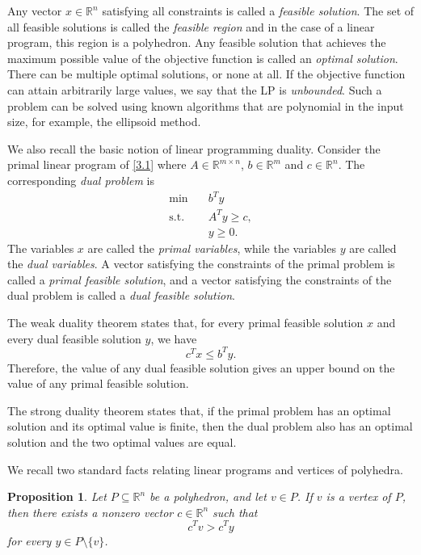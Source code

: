 \documentclass[12pt]{report}
\newtheorem{pprop}[base]{Proposition}
\numberwithin{algorithm}{chapter}
\begin{document}
	Any vector $x \in \mathbb{R}^n$ satisfying all constraints is called a \emph{feasible solution}. The set of all feasible solutions is called the \emph{feasible region} and in the case of a linear program, this region is a polyhedron. Any feasible solution that achieves the maximum possible value of the objective function is called an \emph{optimal solution}. There can be multiple optimal solutions, or none at all. If the objective function can attain arbitrarily large values, we say that the LP is \emph{unbounded}. Such a problem can be solved using known algorithms that are polynomial in the input size, for example, the ellipsoid method.
	
	We also recall the basic notion of linear programming duality. Consider the primal linear program of \eqref{3.1}
	where $A \in \mathbb{R}^{m \times n}$, $b \in \mathbb{R}^{m}$ and $c \in \mathbb{R}^{n}$. The corresponding \emph{dual problem} is
	\[
	\begin{aligned}
		\min \quad & b^Ty \\
		\text{s.t.} \quad & A^Ty \geq c, \\
		& y \geq 0.
	\end{aligned}
	\]
	The variables $x$ are called the \emph{primal variables}, while the variables $y$ are called the \emph{dual variables}. A vector satisfying the constraints of the primal problem is called a \emph{primal feasible solution}, and a vector satisfying the constraints of the dual problem is called a \emph{dual feasible solution}.
	
	The weak duality theorem states that, for every primal feasible solution $x$ and every dual feasible solution $y$, we have
	\[
	c^Tx \leq b^Ty.
	\]
	Therefore, the value of any dual feasible solution gives an upper bound on the value of any primal feasible solution.
	
	The strong duality theorem states that, if the primal problem has an optimal solution and its optimal value is finite, then the dual problem also has an optimal solution and the two optimal values are equal.
	
	We recall two standard facts relating linear programs and vertices of polyhedra. 
	
	\begin{pprop} \label{hyperplane-th}
		Let $P \subseteq \mathbb{R}^{n}$ be a polyhedron, and let $v \in P$. If $v$ is a vertex of $P$, then there exists a nonzero vector $c\in \mathbb{R}^{n}$ such that \[ c^Tv > c^Ty \] for every $y\in P\setminus\{v\}$. 
	\end{pprop}
	
\end{document}

